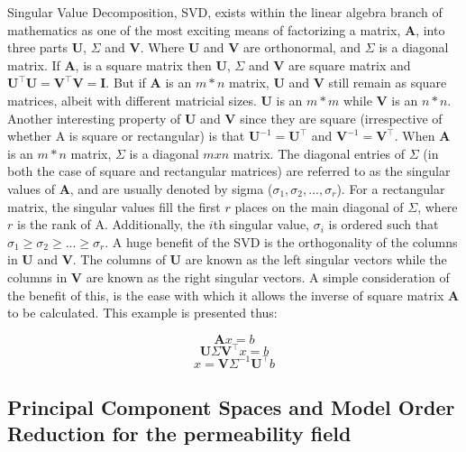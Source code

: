 \documentclass[preprint,12pt]{elsarticle}
\begin{document}
Singular Value Decomposition, SVD, exists within the linear algebra branch of mathematics as one of the most exciting means of factorizing a matrix, $\mathbf{A}$, into three parts $\mathbf{U}$, $\Sigma$ and $\mathbf{V}$. Where $\mathbf{U}$ and $\mathbf{V}$ are orthonormal, and $\Sigma$ is a diagonal matrix. If $\mathbf{A}$, is a square matrix then $\mathbf{U}$, $\Sigma$ and $\mathbf{V}$ are square matrix and $\mathbf{U}^{\intercal}\mathbf{U} = \mathbf{V}^{\intercal}\mathbf{V} = \mathbf{I}$. But if $\mathbf{A}$ is an $m * n$ matrix, $\mathbf{U}$ and $\mathbf{V}$ still remain as square matrices, albeit with different matricial sizes. $\mathbf{U}$ is an $m * m$ while $\mathbf{V}$ is an $n * n$. Another interesting property of $\mathbf{U}$ and $\mathbf{V}$ since they are square (irrespective of whether A is square or rectangular) is that $\mathbf{U}^{-1} = \mathbf{U}^{\intercal}$ and $\mathbf{V}^{-1} = \mathbf{V}^{\intercal}$. When $\mathbf{A}$ is an $m * n$ matrix, $\Sigma$ is a diagonal $m x n$ matrix. The diagonal entries of $\Sigma$ (in both the case of square and rectangular matrices) are referred to as the singular values of $\mathbf{A}$, and are usually denoted by sigma ($\sigma_{1}, \sigma_{2},..., \sigma_{r}$). For a rectangular matrix, the singular values fill the first $r$ places on the main diagonal of $\Sigma$, where $r$ is the rank of A. Additionally, the $i$th singular value, $\sigma_{i}$ is ordered such that $\sigma_{1} \geq \sigma_{2} \geq ...\geq \sigma_{r}$. A huge benefit of the SVD is the orthogonality of the columns in $\mathbf{U}$ and $\mathbf{V}$. The columns of $\mathbf{U}$ are known as the left singular vectors while the columns in $\mathbf{V}$ are known as the right singular vectors. A simple consideration of the benefit of this, is the ease with which it allows the inverse of square matrix $\mathbf{A}$ to be calculated. This example is presented thus:

\begin{equation}
 \mathbf{A}x = b
\end{equation}
\begin{equation}
 \mathbf{U} \Sigma \mathbf{V}^{\intercal} x = b
\end{equation}
\begin{equation}
 x = \mathbf{V} \Sigma^{-1} \mathbf{U}^{\intercal} b
\end{equation}

\subsection{Principal Component Spaces and Model Order Reduction for the permeability field}\label{subsection:pcspaces}
\end{document}

